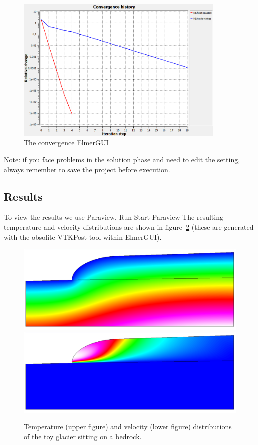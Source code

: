 \begin{figure}
\begin{center}
\includegraphics[width=100mm]{glacier_and_bedrock_toy_convergence}
\caption{The convergence  ElmerGUI}\label{glacrock:conv}
\end{center}
\end{figure}

Note: if you face problems in the solution phase and need to edit the setting, always remember to save
the project before execution.

\subsection*{Results}

To view the results we use Paraview,
\ttbegin
Run
  Start Paraview
\ttend
The resulting temperature and velocity distributions are shown in figure~\ref{glacrock:figtemp} (these are generated with the obsolite VTKPost tool within ElmerGUI).

\begin{figure}
\begin{center}
\includegraphics[width=120mm]{glacier_and_bedrock_toy_temp}
\includegraphics[width=120mm]{glacier_and_bedrock_toy_velo}
\caption{Temperature (upper figure) and velocity (lower figure) distributions 
of the toy glacier sitting on a bedrock.}\label{glacrock:figtemp}
\end{center}
\end{figure}


